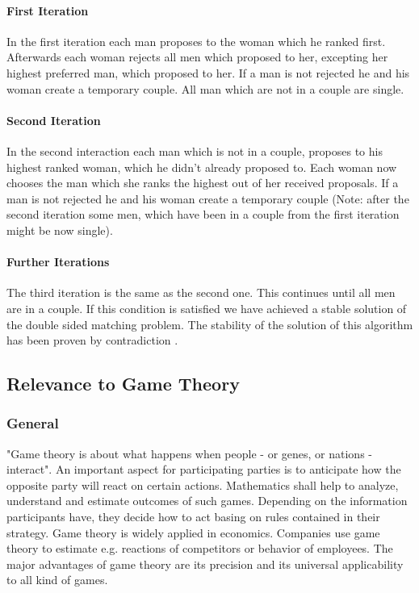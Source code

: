 \paragraph{First Iteration\\}
In the first iteration each man proposes to the woman which he ranked first.
Afterwards each woman rejects all men which proposed to her, excepting her highest preferred man, which proposed to her.
If a man is not rejected he and his woman create a temporary couple.
All man which are not in a couple are single.

\paragraph{Second Iteration\\}
In the second interaction each man which is not in a couple, proposes to his highest ranked woman, which he didn't already proposed to.
Each woman now chooses the man which she ranks the highest out of her received proposals.
If a man is not rejected he and his woman create a temporary couple (Note: after the second iteration some men, which have been in a couple from the first iteration might be now single).

\paragraph{Further Iterations\\}
The third iteration is the same as the second one.
This continues until all men are in a couple.
If this condition is satisfied we have achieved a stable solution of the double sided matching problem.
The stability of the solution of this algorithm has been proven by contradiction \cite{gale62a}.

\subsection{Relevance to Game Theory}

\subsubsection{General}
"Game theory is about what happens when people - or genes, or nations - interact".
An important aspect for participating parties is to anticipate how the opposite party will react on certain actions.
Mathematics shall help to analyze, understand and estimate outcomes of such games. 
Depending on the information participants have, they decide how to act basing on rules contained in their strategy.
Game theory is widely applied in economics.
Companies use game theory to estimate e.g. reactions of competitors or behavior of employees.
The major advantages of game theory are its precision and its universal applicability to all kind of games. \cite[p. 1ff]{camerer2003behavioral}

